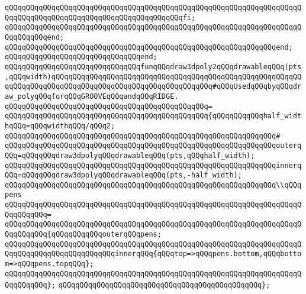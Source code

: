 \verb|qQQqqQQqqQQqqQQqqQQqqQQqqQQqqQQqqQQqqQQqqQQqqQQqqQQqqQQqqQQqqQQqqQQqqQQqqQQqqQQqqQQqqQQqqQQqqQQqqQQqqQQqqQQqqQQqfi;|\newline
\verb|qQQqqQQqqQQqqQQqqQQqqQQqqQQqqQQqqQQqqQQqqQQqqQQqqQQqqQQqqQQqqQQqqQQqqQQqqQQqqQQqend;|\newline
\verb|qQQqqQQqqQQqqQQqqQQqqQQqqQQqqQQqqQQqqQQqqQQqqQQqqQQqqQQqqQQqqQQqend;|\newline
\verb|qQQqqQQqqQQqqQQqqQQqqQQqqQQqqQQqend;|\newline
\newline
\newline
\verb|qQQqqQQqqQQqqQQqqQQqqQQqqQQqqQQqfunqQQqdraw3dpoly2qQQqdrawableqQQq(pts,qQQqwidth)qQQqqQQqqQQqqQQqqQQqqQQqqQQqqQQqqQQqqQQqqQQqqQQqqQQqqQQqqQQqqQQqqQQqqQQqqQQqqQQqqQQqqQQqqQQqqQQqqQQqqQQqqQQq#qQQqUsedqQQqbyqQQqdraw_polyqQQqforqQQqGROOVEqQQqandqQQqRIDGE.|\newline
\verb|qQQqqQQqqQQqqQQqqQQqqQQqqQQqqQQqqQQqqQQqqQQqqQQq=|\newline
\verb|qQQqqQQqqQQqqQQqqQQqqQQqqQQqqQQqqQQqqQQqqQQqqQQq{qQQqqQQqqQQqhalf_widthqQQq=qQQqwidthqQQq/qQQq2;|\newline
\verb|qQQqqQQqqQQqqQQqqQQqqQQqqQQqqQQqqQQqqQQqqQQqqQQqqQQqqQQqqQQqqQQq#|\newline
\verb|qQQqqQQqqQQqqQQqqQQqqQQqqQQqqQQqqQQqqQQqqQQqqQQqqQQqqQQqqQQqqQQqouterqQQq=qQQqqQQqdraw3dpolyqQQqdrawableqQQq(pts,qQQqhalf_width);|\newline
\verb|qQQqqQQqqQQqqQQqqQQqqQQqqQQqqQQqqQQqqQQqqQQqqQQqqQQqqQQqqQQqqQQqinnerqQQq=qQQqqQQqdraw3dpolyqQQqdrawableqQQq(pts,-half_width);|\newline
\newline
\verb|qQQqqQQqqQQqqQQqqQQqqQQqqQQqqQQqqQQqqQQqqQQqqQQqqQQqqQQqqQQqqQQq\\qQQqpens|\newline
\verb|qQQqqQQqqQQqqQQqqQQqqQQqqQQqqQQqqQQqqQQqqQQqqQQqqQQqqQQqqQQqqQQqqQQqqQQqqQQqqQQq=|\newline
\verb|qQQqqQQqqQQqqQQqqQQqqQQqqQQqqQQqqQQqqQQqqQQqqQQqqQQqqQQqqQQqqQQqqQQqqQQqqQQqqQQq{qQQqqQQqqQQqouterqQQqpens;|\newline
\verb|qQQqqQQqqQQqqQQqqQQqqQQqqQQqqQQqqQQqqQQqqQQqqQQqqQQqqQQqqQQqqQQqqQQqqQQqqQQqqQQqqQQqqQQqqQQqqQQqinnerqQQq{qQQqtop=>qQQqpens.bottom,qQQqbottom=>qQQqpens.topqQQq};|\newline
\verb|qQQqqQQqqQQqqQQqqQQqqQQqqQQqqQQqqQQqqQQqqQQqqQQqqQQqqQQqqQQqqQQqqQQqqQQqqQQqqQQq};|\newline
\verb|qQQqqQQqqQQqqQQqqQQqqQQqqQQqqQQqqQQqqQQqqQQqqQQq};|\newline
